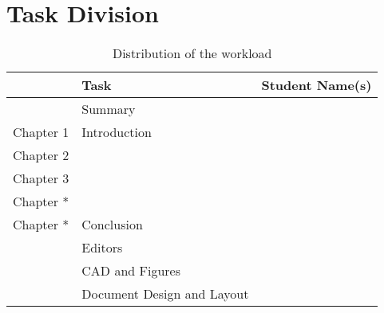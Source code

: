 \chapter{Task Division}

\setlength\extrarowheight{4pt}
\begin{table}[H]
    \centering
    \caption{Distribution of the workload}
    \label{tab:contr-c2}
    \begin{tabularx}{\textwidth}{lXX}
        \toprule
        & Task & Student Name(s) \\
        \midrule
        & Summary & \\
        Chapter 1 & Introduction &  \\
        Chapter 2 &  & \\
        Chapter 3 &  & \\
        Chapter * &  & \\
        Chapter * & Conclusion &  \\
        \midrule
        & Editors & \\
        & CAD and Figures & \\
        & Document Design and Layout & \\
        \bottomrule
    \end{tabularx}
\end{table}
